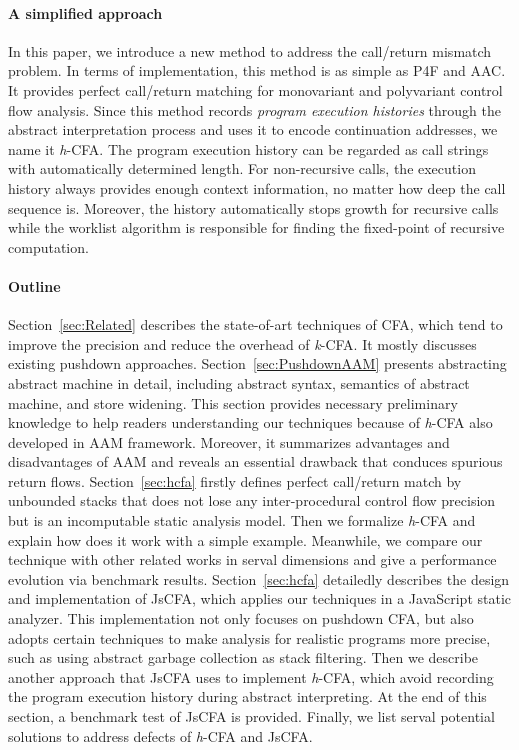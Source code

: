 \documentclass{article}
\begin{document}
\paragraph{A simplified approach}
In this paper, we introduce a new method to address the call/return mismatch problem.
In terms of implementation, this method is as simple as P4F and AAC\@.
It provides perfect call/return matching for monovariant and polyvariant control flow analysis.
Since this method records \emph{program execution histories} through the abstract interpretation process and uses it to encode continuation addresses, we name it \textit{h}-CFA\@.
The program execution history can be regarded as call strings with automatically determined length.
For non-recursive calls, the execution history always provides enough context information, no matter how deep the call sequence is.
Moreover, the history automatically stops growth for recursive calls while the worklist algorithm is responsible
for finding the fixed-point of recursive computation.

\paragraph{Outline}
Section~\ref{sec:Related} describes the state-of-art techniques of CFA, which tend to improve the precision and reduce the overhead of \textit{k}-CFA\@. It mostly discusses existing pushdown approaches.
Section~\ref{sec:PushdownAAM} presents abstracting abstract machine in detail, including abstract syntax, semantics of abstract machine,
and store widening.
This section provides necessary preliminary knowledge to help readers understanding our techniques because of \textit{h}-CFA also developed in AAM framework.
Moreover, it summarizes advantages and disadvantages of AAM and reveals an essential drawback that conduces spurious return flows.
Section~\ref{sec:hcfa} firstly defines perfect call/return match by unbounded stacks that does not lose any inter-procedural control flow precision but is an incomputable static analysis model.
Then we formalize \textit{h}-CFA and explain how does it work with a simple example.
Meanwhile, we compare our technique with other related works in serval dimensions and give a performance evolution via benchmark results.
Section~\ref{sec:hcfa} detailedly describes the design and implementation of JsCFA, which applies our techniques in a JavaScript static analyzer.
This implementation not only focuses on pushdown CFA, but also adopts certain techniques to make analysis for realistic programs more precise, such as using abstract garbage collection as stack filtering.
Then we describe another approach that JsCFA uses to implement \textit{h}-CFA, which avoid recording the program execution history during abstract interpreting.
At the end of this section, a benchmark test of JsCFA is provided.
Finally, we list serval potential solutions to address defects of \textit{h}-CFA and JsCFA\@.
\end{document}

